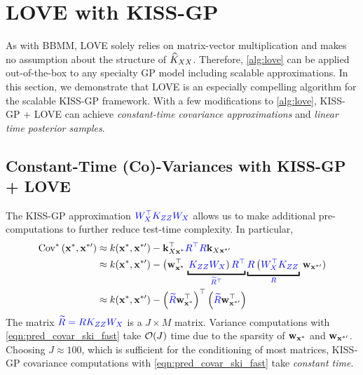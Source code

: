 \section{LOVE with KISS-GP}
\label{sec:love_method_kissgp}



As with BBMM, LOVE solely relies on matrix-vector multiplication and makes no assumption about the structure of $\widehat{K}_{XX}$.
Therefore, \cref{alg:love} can be applied out-of-the-box to any specialty GP model including scalable approximations.
In this section, we demonstrate that LOVE is an especially compelling algorithm for the scalable KISS-GP framework.
With a few modifications to \cref{alg:love}, KISS-GP + LOVE can achieve \emph{constant-time covariance approximations} and \emph{linear time posterior samples}.

\subsection{Constant-Time (Co)-Variances with KISS-GP + LOVE}
The KISS-GP approximation $\color{blue} W_{X}^\top K_{Z Z} W_{X}$ allows us to make additional pre-computations to further reduce test-time complexity.
In particular,
%
\begin{align}
  \covtest{\bxtest}{\bxtestprime}
  &\approx k(\bxtest, \bxtestprime) - \bk_{\bX \bxtest}^\top {\color{blue} \bR^\top \bR} \bk_{\bX \bxtestprime}
  \nonumber
  \\
  &\approx k(\bxtest, \bxtestprime) - \left( \bw^\top_{\bxtest} \right. \underbracket{\left. {\color{blue} \bK_{\bZ\bZ} \bW_\bX} \right) {\color{blue} \bR^\top}}_{\color{blue} \widetilde \bR^\top}
  \underbracket{{\color{blue} \bR} \left( {\color{blue} \bW_\bX^\top \bK_{\bZ\bZ}} \right.}_{\color{blue} \bR} \left. \bw_{\bxtestprime} \right)
  \nonumber
  \\
  &\approx k(\bxtest, \bxtestprime) -
  \left( {\color{blue} \widetilde \bR} \bw^\top_{\bxtest} \right)^\top
  \left( {\color{blue} \widetilde \bR} \bw^\top_{\bxtestprime} \right)
  \label{eqn:pred_covar_ski_fast}
\end{align}
%
The matrix $\color{blue} \widetilde {R} = R K_{ZZ} W_{X}$ is a $J \times M$ matrix.
Variance computations with \cref{eqn:pred_covar_ski_fast} take $\bigo{J}$ time due to the sparsity of $\mathbf{w}_{\mathbf{x}^*}$ and $\mathbf{w}_{\mathbf{x}^{*\prime}}$.
Choosing $J \approx 100$, which is sufficient for the conditioning of most matrices, KISS-GP covariance computations with \cref{eqn:pred_covar_ski_fast} take \emph{constant time}.

